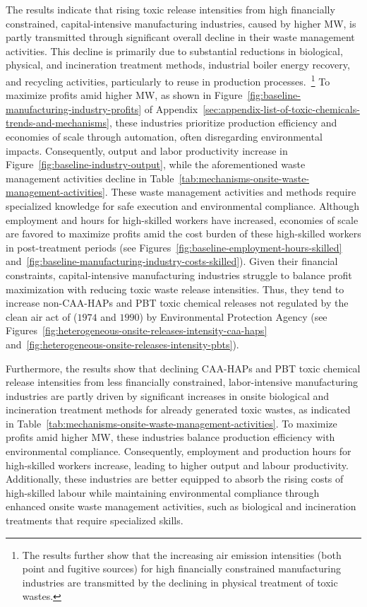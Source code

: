 \documentclass[12pt, english]{article}
\begin{document}
    The results indicate that rising toxic release intensities from high financially constrained, capital-intensive manufacturing industries, caused by higher MW, is partly transmitted through significant overall decline in their waste management activities. This decline is primarily due to substantial reductions in biological, physical, and incineration treatment methods, industrial boiler energy recovery, and recycling activities, particularly to reuse in production processes.~\footnote{\tiny The results further show that the increasing air emission intensities (both point and fugitive sources) for high financially constrained manufacturing industries are transmitted by the declining in physical treatment of toxic wastes.} To maximize profits amid higher MW, as shown in Figure~\ref{fig:baseline-manufacturing-industry-profits} of Appendix~\ref{sec:appendix-list-of-toxic-chemicals-trends-and-mechanisms}, these industries prioritize production efficiency and economies of scale through automation, often disregarding environmental impacts. Consequently, output and labor productivity increase in Figure~\ref{fig:baseline-industry-output}, while the aforementioned waste management activities decline in Table~\ref{tab:mechanisms-onsite-waste-management-activities}. These waste management activities and methods require specialized knowledge for safe execution and environmental compliance. Although employment and hours for high-skilled workers have increased, economies of scale are favored to maximize profits amid the cost burden of these high-skilled workers in post-treatment periods (see Figures~\ref{fig:baseline-employment-hours-skilled} and~\ref{fig:baseline-manufacturing-industry-costs-skilled}). Given their financial constraints, capital-intensive manufacturing industries struggle to balance profit maximization with reducing toxic waste release intensities. Thus, they tend to increase non-CAA-HAPs and PBT toxic chemical releases not regulated by the clean air act of ($1974$ and $1990$) by Environmental Protection Agency (see~ Figures~\ref{fig:heterogeneous-onsite-releases-intensity-caa-haps} and~\ref{fig:heterogeneous-onsite-releases-intensity-pbts}).

    Furthermore, the results show that declining CAA-HAPs and PBT toxic chemical release intensities from less financially constrained, labor-intensive manufacturing industries are partly driven by significant increases in onsite biological and incineration treatment methods for already generated toxic wastes, as indicated in Table~\ref{tab:mechanisms-onsite-waste-management-activities}. To maximize profits amid higher MW, these industries balance production efficiency with environmental compliance. Consequently, employment and production hours for high-skilled workers increase, leading to higher output and labour productivity. Additionally, these industries are better equipped to absorb the rising costs of high-skilled labour while maintaining environmental compliance through enhanced onsite waste management activities, such as biological and incineration treatments that require specialized skills.
\end{document}
